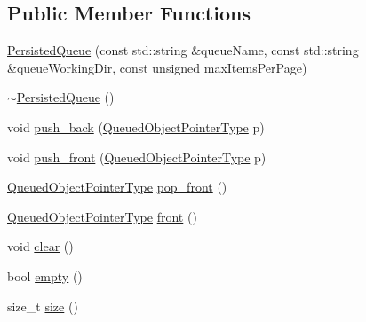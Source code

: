 \subsection*{Public Member Functions}
\begin{DoxyCompactItemize}
\item 
\hyperlink{a00035_a2cd18dcb5bcb354e9cc84897f71077f7}{Persisted\-Queue} (const std\-::string \&queue\-Name, const std\-::string \&queue\-Working\-Dir, const unsigned max\-Items\-Per\-Page)
\item 
\hyperlink{a00035_aa7b51ad9ce0381d197eea1c5aabcac12}{$\sim$\-Persisted\-Queue} ()
\item 
void \hyperlink{a00035_aad570ffebafdabe33d565563aa037d9c}{push\-\_\-back} (\hyperlink{a00070_afaed39dc5f50bc993872e2d46490667c}{Queued\-Object\-Pointer\-Type} p)
\item 
void \hyperlink{a00035_a7c621270f05ecb9bcffb3112e5f46ec4}{push\-\_\-front} (\hyperlink{a00070_afaed39dc5f50bc993872e2d46490667c}{Queued\-Object\-Pointer\-Type} p)
\item 
\hyperlink{a00070_afaed39dc5f50bc993872e2d46490667c}{Queued\-Object\-Pointer\-Type} \hyperlink{a00035_a59281db3a6b7e50c6291d6c707152aea}{pop\-\_\-front} ()
\item 
\hyperlink{a00070_afaed39dc5f50bc993872e2d46490667c}{Queued\-Object\-Pointer\-Type} \hyperlink{a00035_a845cd8c74c5c8996b57bc0663f540940}{front} ()
\item 
void \hyperlink{a00035_a1ad220b2617f732878013e8df8cfadce}{clear} ()
\item 
bool \hyperlink{a00035_a59ce4b260c250368e50ed77becb02415}{empty} ()
\item 
size\-\_\-t \hyperlink{a00035_ab6c18f15d6ac9ccad453729f0e7fa935}{size} ()
\end{DoxyCompactItemize}


